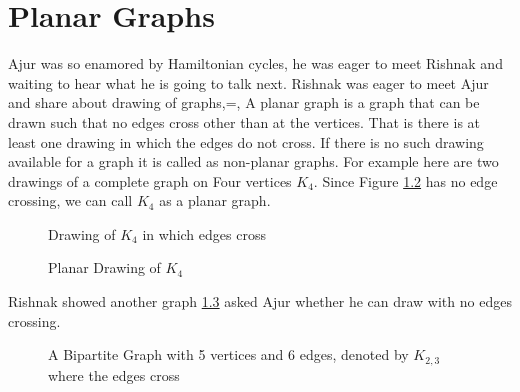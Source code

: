\chapter{Planar Graphs}
Ajur was so enamored by Hamiltonian cycles, he was eager to meet Rishnak and
waiting to hear what he is going to talk next. Rishnak was eager to meet Ajur and share about drawing of graphs,=,
A planar graph is a graph that can be drawn such that no edges cross other than at
the vertices. That is there is at least one drawing in which the edges do not cross.
If there is no such drawing available for a graph it is called as non-planar graphs.
For example here are two drawings of a complete graph on Four vertices $K_4$. Since Figure \ref{9g2} has no edge crossing, we can call $K_4$ as a planar graph.
\begin{figure}
\begin{center}
\caption{ Drawing of $K_4$ in which edges cross}\label{9g1}
\end{center}
\end{figure}
\begin{figure}
\begin{center}
\caption{ Planar Drawing of $K_4$}\label{9g2}
\end{center}
\end{figure}
 Rishnak showed another graph \ref{9g3} asked Ajur whether he can draw with no edges crossing.
 \begin{figure}
\begin{center}
\caption{ A Bipartite Graph with 5 vertices and 6 edges, denoted by $K_{2,3}$ where the edges cross}\label{9g3}
\end{center}
\end{figure}
